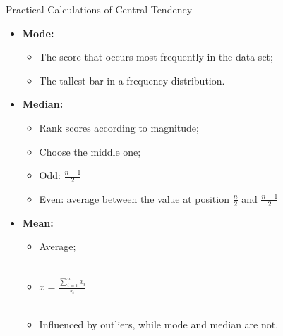 \documentclass[10pt]{beamer}   %
\begin{document}
\begin{frame}{Practical Calculations of Central Tendency}
\begin{itemize}
    \item \textbf{Mode:}
\begin{itemize}
\item The score that occurs most frequently in the data set; 
\item The tallest bar in a frequency distribution.
\end{itemize}
\item \textbf{Median:}
\begin{itemize}
 \item Rank scores according to magnitude;
  \item Choose the middle one;
  \item Odd: $\frac{n+1}{2}$
   \item Even: average between the value at position $\frac{n}{2}$ and $\frac{n+1}{2}$
\end{itemize}
\item \textbf{Mean:}
\begin{itemize}

\item Average; \\~\\ 
 \item $\bar{x}=\frac{\sum^{n}_{i=1}{x_{i}}}{n}$ \\~\\ 
 \item Influenced by outliers, while mode and median are not.

\end{itemize}
\end{itemize}

\end{frame}

\end{document}
